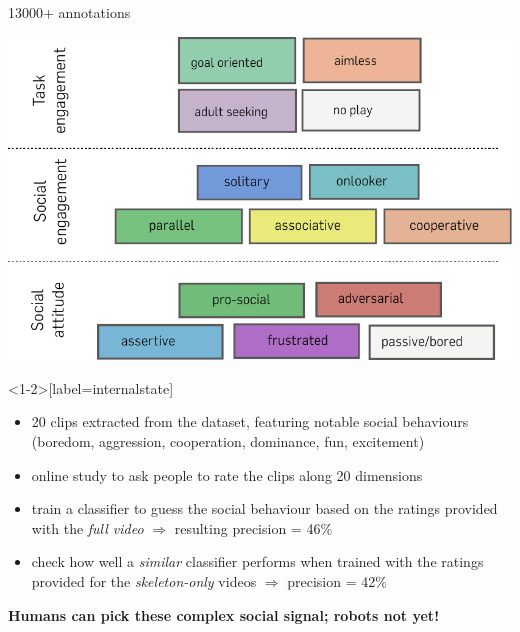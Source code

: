 \documentclass[compress]{beamer}
\begin{document}
{
\begin{frame}{13000+ annotations}
    \begin{center}
        \includegraphics[width=0.8\linewidth]{pinsoro-kinematics/coding-scheme}
    \end{center}
\end{frame}
}

{
\begin{frame}<1-2>[label=internalstate]{}
    \begin{itemize}
        \item<+-> 20 clips extracted from the dataset, featuring notable social
            behaviours (boredom, aggression, cooperation, dominance, fun,
            excitement)
        \item<+-> online study to ask people to rate the clips along 20 dimensions
        \item<+-> train a classifier to guess the social behaviour based on the ratings
            provided with the \emph{full video} $\Rightarrow$ resulting precision = 46\%
        \item<+-> check how well a \emph{similar} classifier performs when trained with the ratings provided for the \emph{skeleton-only} videos $\Rightarrow$ precision = 42\%
    \end{itemize}


    \pause

    {\bf Humans can pick these complex social signal; robots not yet!}

\end{frame}
}
\end{document}
